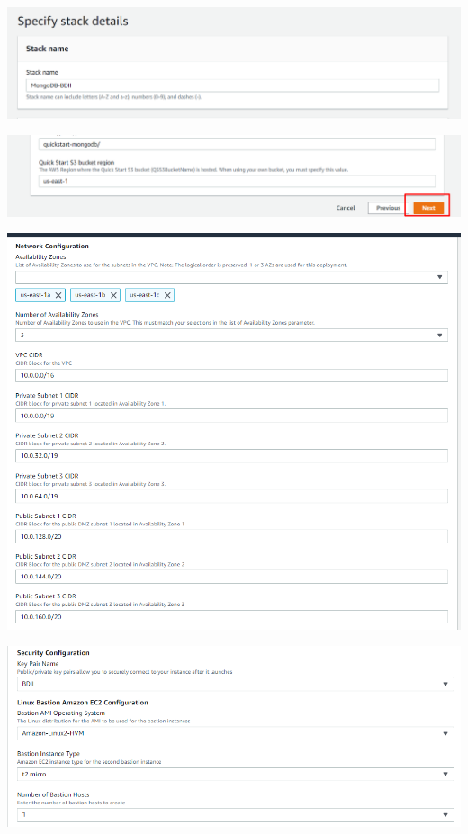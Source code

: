 \documentclass{article}
\begin{document}
    \begin{center}
		\includegraphics[width=15cm]{./images/9} 
	\end{center}
	\begin{center}
		\includegraphics[width=15cm]{./images/10} 
	\end{center}
	\begin{center}
		\includegraphics[width=15cm]{./images/11} 
	\end{center}
	\begin{center}
		\includegraphics[width=15cm]{./images/12} 
	\end{center}
	
\end{document}
